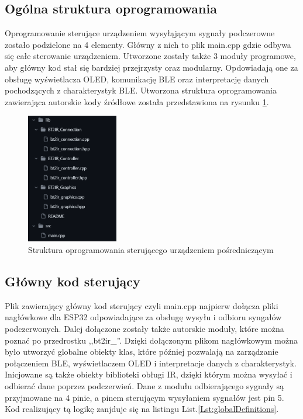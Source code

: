 \documentclass[12pt,twoside]{article}
\begin{document}
\subsection{Ogólna struktura oprogramowania}
Oprogramowanie sterujące urządzeniem wysyłąjącym sygnały podczerowne zostało podzielone na 4 elementy. Główny z nich to plik main.cpp gdzie odbywa się całe sterowanie urządzeniem. Utworzone zostały także 3 moduły programowe, aby główny kod stał się bardziej przejrzysty oraz modularny. Opdowiadają one za obsługę wyświetlacza OLED, komunikację BLE oraz interpretację danych pochodzących z charakterystyk BLE. Utworzona struktura oprogramowania zawierająca autorskie kody źródłowe została przedstawiona na rysunku \ref*{Fig:codeStructure}.
\begin{figure}[ht]
   \centering
   \includegraphics[width=4cm]{images/codeStructure.png}
   \caption{Struktura oprogramowania sterującego urządzeniem pośredniczącym}
   \label{Fig:codeStructure}
\end{figure}

\subsection{Główny kod sterujący}
Plik zawierający główny kod sterujący czyli main.cpp najpierw dołącza pliki nagłówkowe dla ESP32 odpowiadające za obsługę wysyłu i odbioru syngałów podczerwonych. Dalej dołączone zostały także autorskie moduły, które można poznać po przedrostku ,,bt2ir\_''. Dzięki dołączonym plikom nagłówkowym można było utworzyć globalne obiekty klas, które później pozwalają na zarządzanie połączeniem BLE, wyświetlaczem OLED i interpretacje danych z charakterystyk. Inicjowane są także obiekty biblioteki obługi IR, dzięki którym można wysyłać i odbierać dane poprzez podczerwień. Dane z modułu odbierającego sygnały są przyjmowane na 4 pinie, a pinem sterującym wysyłaniem sygnałów jest pin 5. Kod realizujący tą logikę zanjduje się na listingu List.\ref*{Lst:globalDefinitions}.
\end{document}
